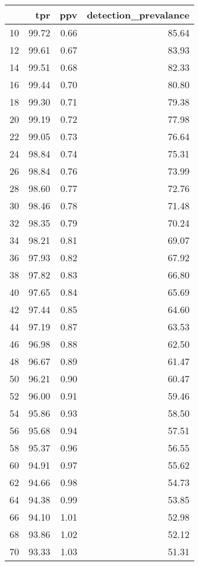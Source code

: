 \begin{table}[ht]
\centering
\begin{tabular}{rrrr}
  \hline
 & tpr & ppv & detection\_prevalance \\ 
  \hline
   10 & 99.72 & 0.66 & 85.64 \\ 
     12 & 99.61 & 0.67 & 83.93 \\ 
     14 & 99.51 & 0.68 & 82.33 \\ 
     16 & 99.44 & 0.70 & 80.80 \\ 
     18 & 99.30 & 0.71 & 79.38 \\ 
     20 & 99.19 & 0.72 & 77.98 \\ 
     22 & 99.05 & 0.73 & 76.64 \\ 
     24 & 98.84 & 0.74 & 75.31 \\ 
     26 & 98.84 & 0.76 & 73.99 \\ 
     28 & 98.60 & 0.77 & 72.76 \\ 
     30 & 98.46 & 0.78 & 71.48 \\ 
     32 & 98.35 & 0.79 & 70.24 \\ 
     34 & 98.21 & 0.81 & 69.07 \\ 
     36 & 97.93 & 0.82 & 67.92 \\ 
     38 & 97.82 & 0.83 & 66.80 \\ 
     40 & 97.65 & 0.84 & 65.69 \\ 
     42 & 97.44 & 0.85 & 64.60 \\ 
     44 & 97.19 & 0.87 & 63.53 \\ 
     46 & 96.98 & 0.88 & 62.50 \\ 
     48 & 96.67 & 0.89 & 61.47 \\ 
     50 & 96.21 & 0.90 & 60.47 \\ 
     52 & 96.00 & 0.91 & 59.46 \\ 
     54 & 95.86 & 0.93 & 58.50 \\ 
     56 & 95.68 & 0.94 & 57.51 \\ 
     58 & 95.37 & 0.96 & 56.55 \\ 
     60 & 94.91 & 0.97 & 55.62 \\ 
     62 & 94.66 & 0.98 & 54.73 \\ 
     64 & 94.38 & 0.99 & 53.85 \\ 
     66 & 94.10 & 1.01 & 52.98 \\ 
     68 & 93.86 & 1.02 & 52.12 \\ 
     70 & 93.33 & 1.03 & 51.31 \\ 

\end{tabular}
\end{table}
